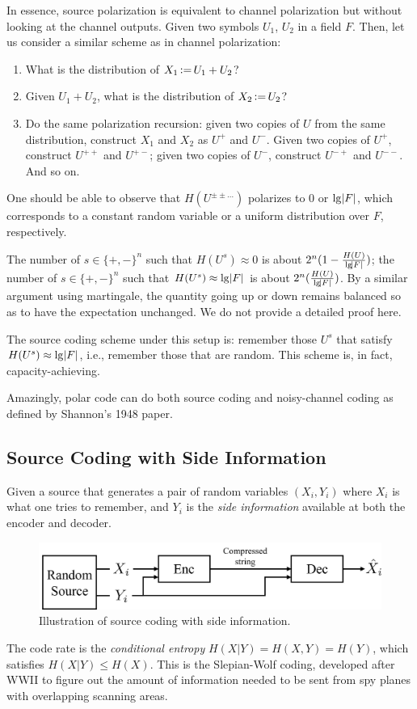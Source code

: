 In essence, source polarization is equivalent to channel polarization but without looking at the channel outputs. Given two symbols $U_1$, $U_2$ in a field $F$. Then, let us consider a similar scheme as in channel polarization:
\begin{enumerate}
    \item What is the distribution of $X_1\operatorname{\vcentcolon=} U_1+U_2$?
    \item Given $U_1+U_2$, what is the distribution of $X_2\operatorname{\vcentcolon=} U_2$?
    \item Do the same polarization recursion: given two copies of $U$ from the same distribution, construct $X_1$ and $X_2$ as $U^+$ and $U^-$. Given two copies of $U^+$, construct $U^{++}$ and $U^{+-}$; given two copies of $U^-$, construct $U^{-+}$ and $U^{--}$. And so on.
\end{enumerate}
One should be able to observe that $H(U^{\pm\pm\ldots})$ polarizes to 0 or $\lg\abs{F}$, which corresponds to a constant random variable or a uniform distribution over $F$, respectively.

The number of $s\in\{+,-\}^n$ such that $H(U^s)\approx 0$ is about $2^n(1-\frac{H(U)}{\lg\abs{F}})$; the number of $s\in\{+,-\}^n$ such that $H(U^s)\approx \lg\abs{F}$ is about $2^n(\frac{H(U)}{\lg\abs{F}})$. By a similar argument using martingale, the quantity going up or down remains balanced so as to have the expectation unchanged. We do not provide a detailed proof here.

The source coding scheme under this setup is: remember those $U^s$ that satisfy $H(U^s) \approx \lg\abs{F}$, i.e., remember those that are random. This scheme is, in fact, capacity-achieving.

Amazingly, polar code can do both source coding and noisy-channel coding as defined by Shannon's 1948 paper.


\subsection{Source Coding with Side Information} \label{sec:slepian_wolf_1}
Given a source that generates a pair of random variables $(X_i,Y_i)$ where $X_i$ is what one tries to remember, and $Y_i$ is the \textit{side information} available at both the encoder and decoder.
\begin{figure}[H]
    \centering
    \includegraphics[width=0.8\linewidth]{figures/w4_enc_dec.png}
    \caption{Illustration of source coding with side information.}
\end{figure}
The code rate is the \textit{conditional entropy} $H(X\vert Y) = H(X,Y) = H(Y)$, which satisfies $H(X\vert Y)\le H(X)$. This is the Slepian-Wolf coding, developed after WWII to figure out the amount of information needed to be sent from spy planes with overlapping scanning areas.

